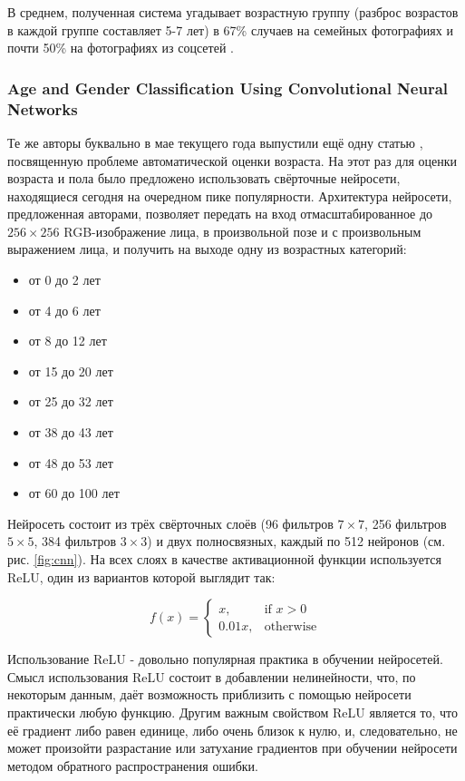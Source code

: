 В среднем, полученная система угадывает возрастную группу (разброс возрастов в каждой группе составляет 5-7 лет) в 67\% случаев на семейных фотографиях и почти 50\% на фотографиях из соцсетей \cite{adience}.

\subsubsection{Age and Gender Classification Using Convolutional Neural Networks}
Те же авторы буквально в мае текущего года выпустили ещё одну статью \cite{cnn_age_gender}, посвященную проблеме автоматической оценки возраста. На этот раз для оценки возраста и пола было предложено использовать свёрточные нейросети, находящиеся сегодня на очередном пике популярности. Архитектура нейросети, предложенная авторами, позволяет передать на вход отмасштабированное до $256 \times 256$ RGB-изображение лица, в произвольной позе и с произвольным выражением лица, и получить на выходе одну из возрастных категорий:
\begin{itemize}
\item от 0 до 2 лет
\item от 4 до 6 лет
\item от 8 до 12 лет
\item от 15 до 20 лет
\item от 25 до 32 лет
\item от 38 до 43 лет
\item от 48 до 53 лет
\item от 60 до 100 лет
\end{itemize}

Нейросеть состоит из трёх свёрточных слоёв (96 фильтров $7 \times 7$, 256 фильтров $5 \times 5$, 384 фильтров $3 \times 3$) и двух полносвязных, каждый по 512 нейронов (см. рис. \ref{fig:cnn}). На всех слоях в качестве активационной функции используется ReLU, один из вариантов которой выглядит так:

$$
f(x)={\begin{cases}x,&{\mbox{if }}x>0\\0.01x,&{\mbox{otherwise}}\end{cases}}
$$

Использование ReLU - довольно популярная практика в обучении нейросетей. Смысл использования ReLU состоит в добавлении нелинейности, что, по некоторым данным, даёт возможность приблизить с помощью нейросети практически любую функцию. Другим важным свойством ReLU является то, что её градиент либо равен единице, либо очень близок к нулю, и, следовательно, не может произойти разрастание или затухание градиентов при обучении нейросети методом обратного распространения ошибки.

